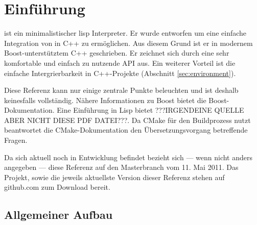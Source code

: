 \section{Einführung}
\label{sec:einfuehrung}

\projectname{} ist ein minimalistischer lisp Interpreter. Er wurde entworfen um eine einfache
Integration von in C++ zu ermöglichen. Aus diesem Grund ist er in modernem Boost-unterstütztem
C++ geschrieben. Er zeichnet sich durch eine sehr komfortable und einfach zu nutzende API aus.
Ein weiterer Vorteil ist die einfache Intergrierbarkeit in C++-Projekte (Abschnitt \ref{sec:environment}).

Diese Referenz kann nur einige zentrale Punkte beleuchten und ist deshalb keinesfalls vollständig. Nähere Informationen zu Boost bietet die Boost-Do\-ku\-men\-ta\-tion. Eine Einführung in Lisp bietet ???IRGENDEINE QUELLE ABER NICHT DIESE PDF DATEI???. Da \projectname{} CMake für den Buildprozess nutzt beantwortet die CMake-Dokumentation den Übersetzungsvorgang betreffende Fragen.

Da sich \projectname{} aktuell noch in Entwicklung befindet bezieht sich --- wenn nicht anders angegeben --- diese Referenz auf den Masterbranch vom 11. Mai 2011.
Das Projekt, sowie die jeweils aktuellste Version dieser Referenz stehen auf github.com zum Download bereit. %

\subsection{Allgemeiner Aufbau}

